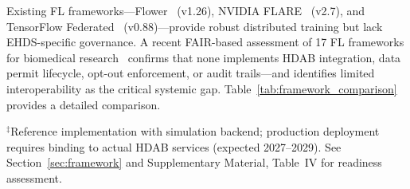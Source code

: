 \documentclass[conference,a4paper]{IEEEtran}
\begin{document}
Existing FL frameworks---Flower~\cite{beutel2023flower} (v1.26), NVIDIA FLARE~\cite{nvflare2023} (v2.7), and TensorFlow Federated~\cite{tff2019} (v0.88)---provide robust distributed training but lack EHDS-specific governance. A recent FAIR-based assessment of 17 FL frameworks for biomedical research~\cite{chaverodiez2026fair} confirms that none implements HDAB integration, data permit lifecycle, opt-out enforcement, or audit trails---and identifies limited interoperability as the critical systemic gap. Table~\ref{tab:framework_comparison} provides a detailed comparison.

\begin{table}[htbp]
\centering
\caption{Framework Comparison: FL-EHDS vs Existing FL Frameworks}
\label{tab:framework_comparison}

\vspace{1mm}
\footnotesize{$^\ddagger$Reference implementation with simulation backend; production deployment requires binding to actual HDAB services (expected 2027--2029). See Section~\ref{sec:framework} and Supplementary Material, Table~IV for readiness assessment.}
\end{table}
\end{document}

